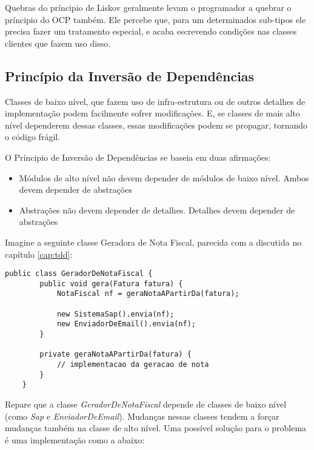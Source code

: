 Quebras do príncipio de Liskov geralmente levam o programador a quebrar o
príncipio do OCP também. Ele percebe que, para um determinados sub-tipos ele 
precisa fazer um tratamento especial, e acaba escrevendo condições nas classes 
clientes que fazem uso disso.

\subsection{Princípio da Inversão de Dependências}
\label{subsec:dip}

Classes de baixo nível, que fazem uso de infra-estrutura ou de outros detalhes
de implementação podem facilmente sofrer modificações. E, se classes de mais alto
nível dependerem dessas classes, essas modificações podem se propagar, tornando
o código frágil.

O Príncipio de Inversão de Dependências se baseia em duas afirmações:

\begin{itemize}
	\item Módulos de alto nível não devem depender de módulos de baixo nível. 
	Ambos devem depender de abstrações
	\item Abstrações não devem depender de detalhes. Detalhes devem depender de
	abstrações
\end{itemize}

Imagine a seguinte classe Geradora de Nota Fiscal, parecida com a discutida no
capítulo \ref{cap:tdd}:

\begin{lstlisting}[frame=trbl]
	public class GeradorDeNotaFiscal {
		public void gera(Fatura fatura) {
			NotaFiscal nf = geraNotaAPartirDa(fatura);
			
			new SistemaSap().envia(nf);
			new EnviadorDeEmail().envia(nf);
		}
		
		private geraNotaAPartirDa(fatura) {
			// implementacao da geracao de nota
		}
	}
\end{lstlisting}

Repare que a classe \textit{GeradorDeNotaFiscal} depende de classes de baixo
nível (como \textit{Sap} e \textit{EnviadorDeEmail}). Mudanças nessas classes
tendem a forçar mudanças também na classe de alto nível. Uma possível solução para o problema é
uma implementação como a abaixo:

